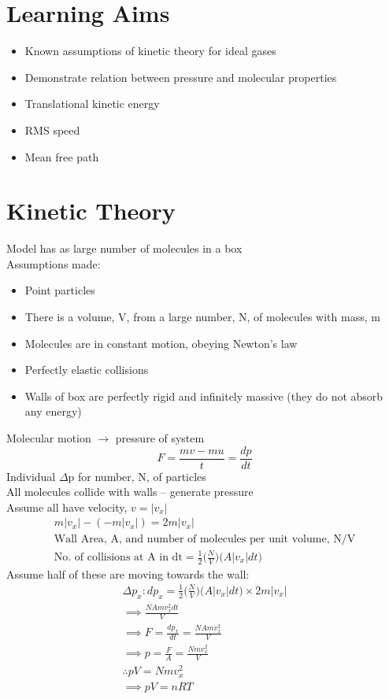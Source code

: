 \documentclass[a4paper, 11pt, fleqn, normalem]{report}
\begin{document}
\section*{Learning Aims}
\begin{itemize}
	\item Known assumptions of kinetic theory for ideal gases
	\item Demonstrate relation between pressure and molecular properties
	\item Translational kinetic energy
	\item RMS speed
	\item Mean free path
\end{itemize}

\section*{Kinetic Theory}
Model has as large number of molecules in a box \\
Assumptions made:
\vspace{-8pt}
\begin{itemize}
	\item[] Point particles
	\item[] There is a volume, V, from a large number, N, of molecules with mass, m
	\item[] Molecules are in constant motion, obeying Newton's law
	\item[] Perfectly elastic collisions
	\item[] Walls of box are perfectly rigid and infinitely massive (they do not absorb any energy)
\end{itemize}
\vspace{-8pt}
Molecular motion $\rightarrow$ pressure of system
\begin{equation*}
	F = \frac{mv-mu}{t} = \frac{dp}{dt}
\end{equation*}
Individual $\Delta$p for number, N, of particles \\
All molecules collide with walls -- generate pressure \\
Assume all have velocity, $v = |v_{x}|$
\begin{gather*}
	m|v_{x}| - (-m|v_{x}|) = 2m|v_{x}| \\
	\text{Wall Area, A, and number of molecules per unit volume, N/V} \\
	\text{No. of collisions at A in dt} = \frac{1}{2}\Big(\frac{N}{V}\Big)\big(A|v_{x}|dt\big)
\end{gather*}
Assume half of these are moving towards the wall:
\begin{gather*}
	{\Delta}p_{x}: dp_{x} = \frac{1}{2}\Big(\frac{N}{V}\Big)\big(A|v_{x}|dt\big) \times 2m|v_{x}| \\
	\implies \frac{NAmv^{2}_{x}dt}{V} \\
	\implies F = \frac{dp_{x}}{dt} = \frac{NAmv^{2}_{x}}{V} \\
	\implies p = \frac{F}{A} = \frac{Nmv^{2}_{x}}{V} \\
	\therefore pV = Nmv^{2}_{x} \\
	\implies pV = nRT
\end{gather*}
\end{document}
